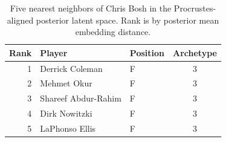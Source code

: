 \begin{table}[htbp]
  \centering\small
  \begin{tabular}{rllc}
    \toprule
    Rank & Player & Position & Archetype \\
    \midrule
    1 & Derrick Coleman & F & 3 \\
    2 & Mehmet Okur & F & 3 \\
    3 & Shareef Abdur-Rahim & F & 3 \\
    4 & Dirk Nowitzki & F & 3 \\
    5 & LaPhonso Ellis & F & 3 \\
    \bottomrule
  \end{tabular}
  \caption{Five nearest neighbors of Chris Bosh in the Procrustes-aligned posterior latent space. Rank is by posterior mean embedding distance.}
  \label{tab:Chris_Bosh_neighbors}
\end{table}

